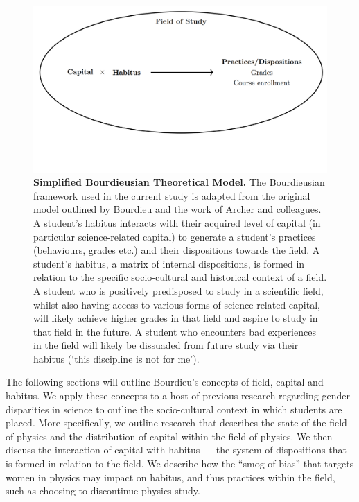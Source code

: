 \begin{figure}[!ht]
\includegraphics[width = \linewidth]{C3 - Bourdieu Networks/C3 - Fig1.png}
\begin{center}
\end{center}
\caption{\textbf{Simplified Bourdieusian Theoretical Model.\newline}
The Bourdieusian framework used in the current study is adapted from the original model outlined by Bourdieu\cite{Bourdieu1984} and the work of Archer and colleagues.\cite{Archer2012,Archer2014, Archer_2015} A student's habitus interacts with their acquired level of capital (in particular science-related capital) to generate a student's practices (behaviours, grades etc.) and their dispositions towards the field. A student's habitus, a matrix of internal dispositions\cite{Reay2004}, is formed in relation to the specific socio-cultural and historical context of a field. A student who is positively predisposed to study in a scientific field, whilst also having access to various forms of science-related capital, will likely achieve higher grades in that field and aspire to study in that field in the future. A student who encounters bad experiences in the field will likely be dissuaded from future study via their habitus (`this discipline is not for me').}
\label{Fig1} 
\end{figure}

The following sections will outline Bourdieu's concepts of field, capital and habitus. We apply these concepts to a host of previous research regarding gender disparities in science to outline the socio-cultural context in which students are placed. More specifically, we outline research that describes the state of the field of physics and the distribution of capital within the field of physics. We then discuss the interaction of capital with habitus --- the system of dispositions that is formed in relation to the field. We describe how the ``smog of bias''\cite{Kost_Smith_2010} that targets women in physics may impact on habitus, and thus practices within the field, such as choosing to discontinue physics study. 

